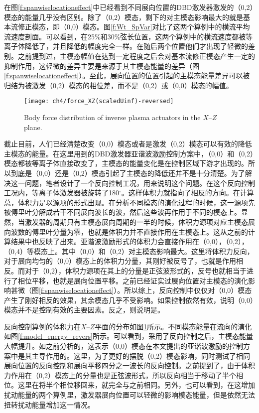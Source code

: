 在图\ref{f:spanwiselocationeffect}中已经看到不同展向位置的DBD激发器激发的（0,2）模态的能量几乎没有区别。除了（0,2）模态，剩下的对主模态影响最大的就是基本流修正模态，即（0,0）模态。图\ref{f:Wt_SpVar}对比了这两个算例中的横流平均流速度剖面。可以看到，在25\%和30\%弦长位置，这两个算例中的横流速度都被等离子体降低了，并且降低的幅度完全一样。在随后两个位置他们才出现了轻微的差别。之前提到过，主模态幅值在达到一定程度之后会对基本流修正模态产生一定的抑制作用，这轻微的差异主要是来源于其主模态能量的差异（图\ref{f:spanwiselocationeffect}）。至此，展向位置的位置引起的主模态能量差异可以被归结为被激发（0,2）模态的相位差，而不是（0,2）或（0,0）模态的幅值。
\begin{figure}
\centering
\texttt{[image: ch4/force\_XZ(scaledUinf)-reversed]}
\caption{Body force distribution of inverse plasma actuators in the $X$--$Z$ plane.}%
\label{f:force_reversed}
\end{figure}

截止目前，人们已经清楚改变（0,0）模态\cite{dorr2016}或者是激发（0,2）模态\cite{Saric1998}可以有效的降低主模态的能量。在这里用到的DBD激发器亚谐波激励控制方案中，（0,0）和（0,2）模态都被等离子体直接改变了，主模态的能量变化是在控制区域下游才出现的。所以到底是（0,0）还是（0,2）模态引起了主模态的降低还并不是十分清楚。为了解决这一问题，笔者设计了一个反向控制工况，用来说明这个问题。在这个反向控制工况内，等离子体激发器被旋转了180$^\circ$。这样体积力就指向了相反的方向。在计算总，体积力是以源项的形式出现。在分析不同模态的演化过程的时候，这一源项先被傅里叶分解成若干不同展向波长的波，然后这些波再作用于不同的模态上。显然，当激发器的周期只有主模态展向周期的一半的时候，体积力源项对应主模态展向波数的傅里叶分量为零，也就是体积力并不直接作用在主模态上。这从之前的计算结果中也反映了出来。亚谐波激励形式的体积力会直接作用在（0,0），（0,2），（0,4）等模态上。其中（0,0）和（0,2）对主模态影响最大。这里将体积力反向，对于展向均匀的（0,0）模态上的体积力分量，其刚好被反号了，也就是作用相反。而对于（0,2），体积力源项在其上的分量是正弦波形式的，反号也就相当于进行了相位平移，也就是展向位置平移。之前已经证实过展向位置对主模态的演化影响甚微（图\ref{f:spanwiselocationeffect}）。所以综上，反向控制中仅仅对（0,0）模态产生了刚好相反的效果，其余模态几乎不受影响。如果控制依然有效，说明（0,0）模态并不是控制有效的主要因素。反之，则说明是。

反向控制算例的体积力在$X$--$Z$平面的分布如图\ref{f:force_reversed}所示。不同模态能量在流向的演化如图\ref{f:model_energy_revers}所示。可以看到，采用了反向控制之后，主模态能量大幅提升。如之前分析的，这表示（0,0）模态在本文提出的亚谐波激励的控制方案中是其主导作用的。这里，为了更好的摆脱（0,2）模态影响，同时测试了相同展向位置的反向控制和展向平移四分之一波长的反向控制。之前提到了，由于体积力作用在（0,2）模态上的分量也是正弦波形式，所以反向相当于移动了半个相位。这里在将半个相位移回来，就完全与之前相同。另外，也可以看到，在这增加扰动能量的两个算例里，激发器展向位置可以轻微的影响模态能量，但是依然无法扭转扰动能量增加这一情况。

